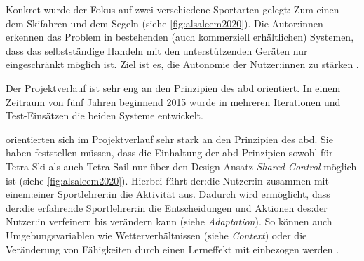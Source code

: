 \documentclass[sigchi-a,screen,nonacm,language=german]{acmart}
\theoremstyle{acmdefinition}
\begin{document}

Konkret wurde der Fokus auf zwei verschiedene Sportarten gelegt: Zum einen dem Skifahren und dem Segeln (siehe \autoref{fig:alsaleem2020}). Die Autor:innen erkennen das Problem in bestehenden (auch kommerziell erhältlichen) Systemen, dass das selbstständige Handeln mit den unterstützenden Geräten nur eingeschränkt möglich ist. Ziel ist es, die Autonomie der Nutzer:innen zu stärken \citep[vgl.][S.~2]{alsaleem:2020:adaptive-outdoor-activities}.




Der Projektverlauf ist sehr eng an den Prinzipien des \ac{abd} orientiert. In einem Zeitraum von fünf Jahren beginnend 2015 wurde in mehreren Iterationen und Test-Einsätzen die beiden Systeme entwickelt.








\citet{alsaleem:2020:adaptive-outdoor-activities} orientierten sich im Projektverlauf sehr stark an den Prinzipien des \ac{abd}. Sie haben feststellen müssen, dass die Einhaltung der \ac{abd}-Prinzipien sowohl für Tetra-Ski als auch Tetra-Sail nur über den Design-Ansatz \emph{Shared-Control} möglich ist (siehe \autoref{fig:alsaleem2020}). Hierbei führt der:die Nutzer:in zusammen mit einem:einer Sportlehrer:in die Aktivität aus. Dadurch wird ermöglicht, dass der:die erfahrende Sportlehrer:in die Entscheidungen und Aktionen des:der Nutzer:in verfeinern bis verändern kann (siehe \emph{Adaptation}). So können auch Umgebungsvariablen wie Wetterverhältnissen (siehe \emph{Context}) oder die Veränderung von Fähigkeiten durch einen Lerneffekt mit einbezogen werden \citep[vgl.][S.~4-5]{alsaleem:2020:adaptive-outdoor-activities}.
\end{document}
